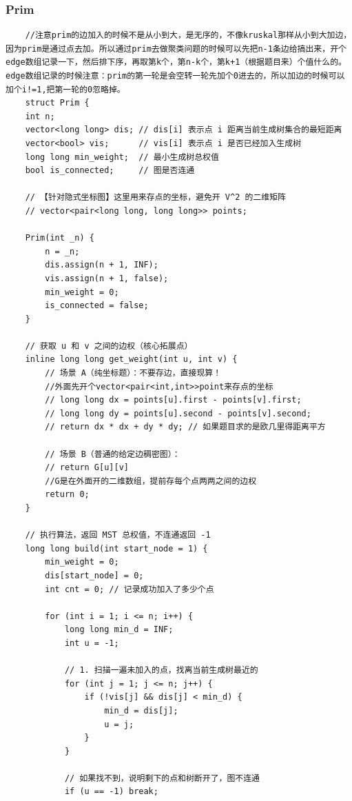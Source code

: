 \documentclass[10pt, a4paper, twocolumn]{article} %
\begin{document}
    \subsubsection{Prim}
    \begin{lstlisting}
    //注意prim的边加入的时候不是从小到大，是无序的，不像kruskal那样从小到大加边，因为prim是通过点去加。所以通过prim去做聚类问题的时候可以先把n-1条边给搞出来，开个edge数组记录一下，然后排下序，再取第k个，第n-k个，第k+1（根据题目来）个值什么的。edge数组记录的时候注意：prim的第一轮是会空转一轮先加个0进去的，所以加边的时候可以加个i!=1,把第一轮的0忽略掉。
    struct Prim {
    int n;
    vector<long long> dis; // dis[i] 表示点 i 距离当前生成树集合的最短距离
    vector<bool> vis;      // vis[i] 表示点 i 是否已经加入生成树
    long long min_weight;  // 最小生成树总权值
    bool is_connected;     // 图是否连通

    // 【针对隐式坐标图】这里用来存点的坐标，避免开 V^2 的二维矩阵
    // vector<pair<long long, long long>> points;

    Prim(int _n) {
        n = _n;
        dis.assign(n + 1, INF);
        vis.assign(n + 1, false);
        min_weight = 0;
        is_connected = false;
    }

    // 获取 u 和 v 之间的边权（核心拓展点）
    inline long long get_weight(int u, int v) {
        // 场景 A（纯坐标题）：不要存边，直接现算！
        //外面先开个vector<pair<int,int>>point来存点的坐标
        // long long dx = points[u].first - points[v].first;
        // long long dy = points[u].second - points[v].second;
        // return dx * dx + dy * dy; // 如果题目求的是欧几里得距离平方

        // 场景 B（普通的给定边稠密图）：
        // return G[u][v]
        //G是在外面开的二维数组，提前存每个点两两之间的边权
        return 0; 
    }

    // 执行算法，返回 MST 总权值，不连通返回 -1
    long long build(int start_node = 1) {
        min_weight = 0;
        dis[start_node] = 0;
        int cnt = 0; // 记录成功加入了多少个点

        for (int i = 1; i <= n; i++) {
            long long min_d = INF;
            int u = -1;

            // 1. 扫描一遍未加入的点，找离当前生成树最近的
            for (int j = 1; j <= n; j++) {
                if (!vis[j] && dis[j] < min_d) {
                    min_d = dis[j];
                    u = j;
                }
            }

            // 如果找不到，说明剩下的点和树断开了，图不连通
            if (u == -1) break;


\end{lstlisting}
\end{document}
